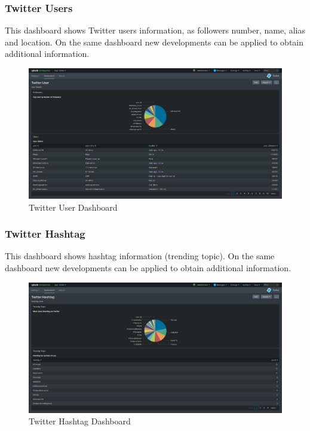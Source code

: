 \documentclass[report]{article}
\begin{document}
\subsubsection{Twitter Users}

This dashboard shows Twitter users information, as followers number, name, alias and location. On the same dashboard new developments can be applied to obtain additional information.
\newline
\begin{figure}[h!]
	\centering
	\includegraphics[scale=0.2]{img/user.png}
	\caption{\color{text}Twitter User Dashboard}
\end{figure}

\subsubsection{Twitter Hashtag}

This dashboard shows hashtag information (trending topic). On the same dashboard new developments can be applied to obtain additional information.
\newline
\begin{figure}[h!]
	\centering
	\includegraphics[scale=0.2]{img/hashtag.png}
	\caption{\color{text}Twitter Hashtag Dashboard}
\end{figure}
\end{document}
